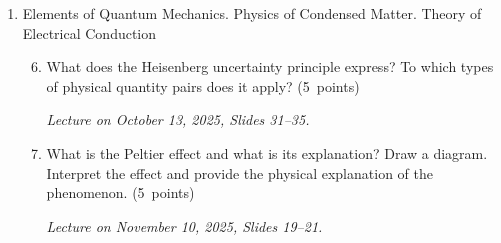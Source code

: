 \documentclass[a4paper,12pt]{letter}
\begin{document}
\begin{enumerate}[label=\Roman*.]
\begin{enumerate}[label=\arabic*.]
\item Describe the Compton experiment and provide a qualitative but precise explanation of the phenomenon of Compton scattering. \hfill (5~points)

\smallskip
\textit{Lecture on October 6, 2025, Slides 29--31.}

\item Formulate the de Broglie principle in your own words. \hfill (5~points)

\smallskip
\textit{Lecture on October 20, 2025, Slide 23.}

 
\end{enumerate}
  

\item Elements of Quantum Mechanics. Physics of Condensed Matter. Theory of Electrical Conduction

\begin{enumerate}[label=\arabic*.]
\setcounter{enumii}{5} %
  
\item What does the Heisenberg uncertainty principle express? To which types of physical quantity pairs does it apply? \hfill (5~points)

\smallskip
\textit{Lecture on October 13, 2025, Slides 31--35.}


\item What is the Peltier effect and what is its explanation? Draw a diagram. Interpret the effect and provide the physical explanation of the phenomenon. \hfill (5~points)

\smallskip
\textit{Lecture on November 10, 2025, Slides 19--21.}

\end{enumerate}

  

\end{enumerate}
\end{document}
